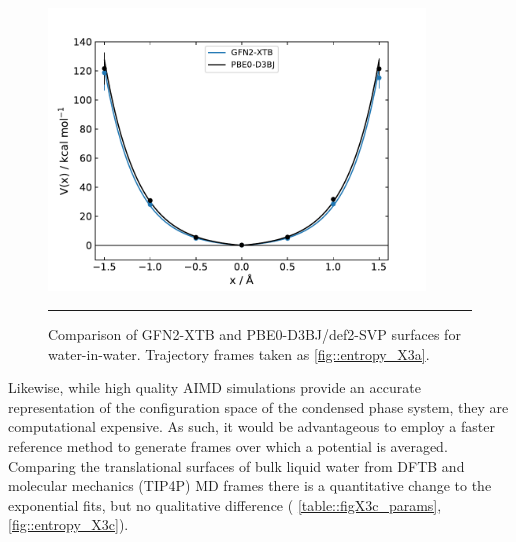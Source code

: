 \documentclass[../main.tex]{subfiles}
\begin{document}
\begin{figure}[h!]
	\centering
	\includegraphics[width=10cm]{4/figs/figX3/dft_vs_xtb_well.pdf}
	\vspace{0.2cm}
	\hrule
	\caption{Comparison of GFN2-XTB and PBE0-D3BJ/def2-SVP surfaces for water-in-water. Trajectory frames taken as \figurename{ \ref{fig::entropy_X3a}}.}
	\label{fig::entropy_X3b}
\end{figure}

Likewise, while high quality AIMD simulations provide an accurate representation of the configuration space of the condensed phase system, they are computational expensive. As such, it would be advantageous to employ a faster reference method to generate frames over which a potential is averaged. Comparing the translational surfaces of bulk liquid water from DFTB and molecular mechanics (TIP4P) MD frames there is a quantitative change to the exponential fits, but no qualitative difference (\tablename{ \ref{table::figX3c_params}}, \figurename{ \ref{fig::entropy_X3c}}).
\vspace{0.2cm}
\end{document}
